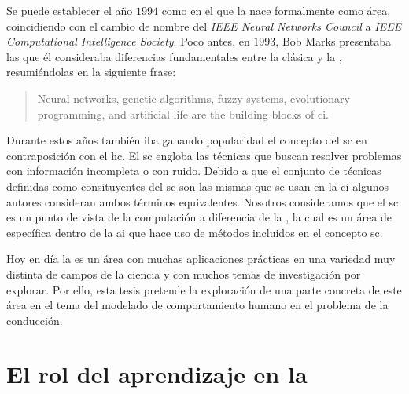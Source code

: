 Se puede establecer el año $1994$ como en el que la  nace formalmente como área, coincidiendo con el cambio de nombre del \textit{IEEE Neural Networks Council} a \textit{IEEE Computational Intelligence Society}. Poco antes, en $1993$, Bob Marks presentaba las que él consideraba diferencias fundamentales entre la  clásica y la , resumiéndolas en la siguiente frase:

\blockquote{Neural networks, genetic algorithms, fuzzy systems, evolutionary programming, and artificial life are the building blocks of \ac{ci}.}

Durante estos años también iba ganando popularidad el concepto del \gls{sc} en contraposición con el \gls{hc}. El \gls{sc} engloba las técnicas que buscan resolver problemas con información incompleta o con ruido. Debido a que el conjunto de técnicas definidas como consituyentes del \gls{sc} son las mismas que se usan en la \gls{ci} algunos autores consideran ambos términos equivalentes. Nosotros consideramos que el \gls{sc} es un punto de vista de la computación a diferencia de la , la cual es un área de específica dentro de la \gls{ai} que hace uso de métodos incluidos en el concepto \gls{sc}.

Hoy en día la  es un área con muchas aplicaciones prácticas en una variedad muy distinta de campos de la ciencia y con muchos temas de investigación por explorar. Por ello, esta tesis pretende la exploración de una parte concreta de este área en el tema del modelado de comportamiento humano en el problema de la conducción.

\section{El rol del aprendizaje en la }
\label{s:the-learning-role}

